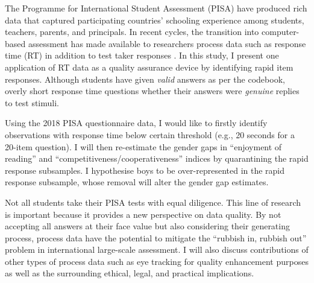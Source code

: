 The Programme for International Student Assessment (PISA) have produced rich data that captured participating countries' schooling experience among students, teachers, parents, and principals. In recent cycles, the transition into computer-based assessment has made available to researchers process data such as response time (RT) in addition to test taker responses \parencite{oced:2020a}. In this study, I present one application of RT data as a quality assurance device by identifying rapid item responses. Although students have given \emph{valid} answers as per the codebook, overly short response time questions whether their answers were \emph{genuine} replies to test stimuli.

Using the 2018 PISA questionnaire data, I would like to firstly identify observations with response time below certain threshold (e.g., 20 seconds for a 20-item question). I will then re-estimate the gender gaps in ``enjoyment of reading'' and ``competitiveness/cooperativeness'' indices \parencite{oced:2020b} by quarantining the rapid response subsamples. I hypothesise boys to be over-represented in the rapid response subsample, whose removal will alter the gender gap estimates.

Not all students take their PISA tests with equal diligence. This line of research is important because it provides a new perspective on data quality. By not accepting all answers at their face value but also considering their generating process, process data have the potential to mitigate the ``rubbish in, rubbish out'' problem in international large-scale assessment. I will also discuss contributions of other types of process data such as eye tracking for quality enhancement purposes as well as the surrounding ethical, legal, and practical implications.
